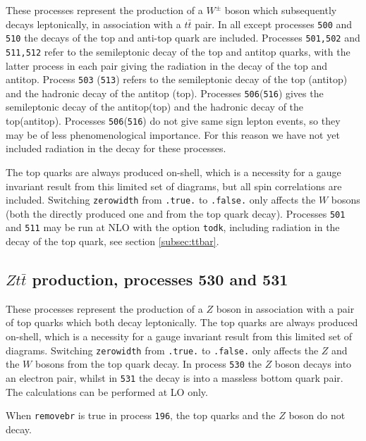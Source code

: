 \documentclass[12pt]{article}
\begin{document}
These processes represent the production of a $W^\pm$ boson which subsequently
decays leptonically, in association with a $t{\bar t}$ pair. In all except processes 
{\tt 500} and {\tt 510} the decays of the top and anti-top quark are included.
Processes {\tt 501,502} and {\tt 511,512} refer to the semileptonic decay of the top and antitop quarks,
with the latter process in each pair giving the radiation in the decay of the top and antitop.
Process {\tt 503} ({\tt 513}) refers to the semileptonic decay of the top (antitop)
and the hadronic decay of the antitop (top). Processes {\tt 506}({\tt 516}) gives the semileptonic
decay of the antitop(top) and the hadronic decay of the top(antitop).  Processes {\tt 506}({\tt 516}) 
do not give same sign lepton events, so they may be of less phenomenological importance. For this reason 
we have not yet included radiation in the decay for these processes. 

The top quarks are always
produced on-shell, which is a necessity for a gauge invariant result
from this limited set of diagrams, but all spin correlations are included.
Switching {\tt zerowidth} from {\tt .true.} to {\tt .false.} only affects
the $W$ bosons (both the directly produced one and from the top quark decay).
Processes {\tt 501} and {\tt 511} may be run at NLO with the option {\tt todk},
including radiation in the decay of the top quark, see section \ref{subsec:ttbar}.






\subsection{$Zt{\bar t}$ production, processes 530 and 531}
\label{subsec:ztt}

These processes represent the production of a $Z$ boson in association
with a pair of top quarks which both decay leptonically.
The top quarks are always
produced on-shell, which is a necessity for a gauge invariant result
from this limited set of diagrams.
Switching {\tt zerowidth} from {\tt .true.} to {\tt .false.} only affects
the $Z$ and the $W$ bosons from the top quark decay.
In process {\tt 530} the $Z$ boson decays into an electron pair, whilst
in {\tt 531} the decay is into a massless bottom quark pair.
The calculations can be performed at LO only.

When {\tt removebr} is true in process {\tt 196}, the top quarks and the $Z$ boson do not decay.
\end{document}

